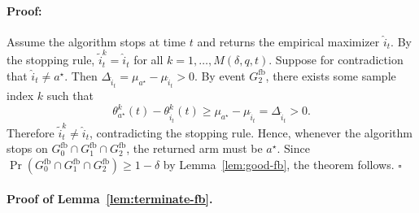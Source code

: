 \documentclass{article}
\newenvironment{proof}{\paragraph{Proof:}}{\hfill$\square$}
\begin{document}
\begin{proof}
Assume the algorithm stops at time $t$ and returns the empirical maximizer $\widehat i_t$. By the stopping rule, $\widetilde i_t^k = \widehat i_t$ for all $k=1,\dots,M(\delta,q,t)$. Suppose for contradiction that $\widehat i_t\neq a^\star$. Then $\Delta_{\widehat i_t}=\mu_{a^\star}-\mu_{\widehat i_t}>0$. By event $G_2^{\mathrm{fb}}$, there exists some sample index $k$ such that
\[
\theta_{a^\star}^k(t)-\theta_{\widehat i_t}^k(t)
\ge
\mu_{a^\star}-\mu_{\widehat i_t}
= \Delta_{\widehat i_t} > 0.
\]
Therefore $\widetilde i_t^k \neq \widehat i_t$, contradicting the stopping rule. Hence, whenever the algorithm stops on $G_0^{\mathrm{fb}}\cap G_1^{\mathrm{fb}}\cap G_2^{\mathrm{fb}}$, the returned arm must be $a^\star$. Since $\Pr(G_0^{\mathrm{fb}}\cap G_1^{\mathrm{fb}}\cap G_2^{\mathrm{fb}})\ge 1-\delta$ by Lemma~\ref{lem:good-fb}, the theorem follows.
\end{proof}

\paragraph{Proof of Lemma~\ref{lem:terminate-fb}.}
\end{document}
